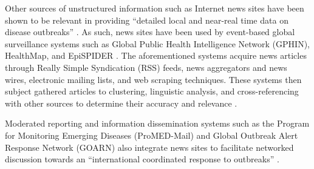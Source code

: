 Other sources of unstructured information such as Internet news sites have been shown to be relevant in providing ``detailed local and near-real time data on disease outbreaks'' \cite{heymann2001hot,madoff2005internet,morse2007global}. As such, news sites have been used by event-based global surveillance systems such as Global Public Health Intelligence Network (GPHIN), HealthMap, and EpiSPIDER \cite{keller2009use}. The aforementioned systems acquire news articles through Really Simple Syndication (RSS) feeds, news aggregators and news wires, electronic mailing lists, and web scraping techniques. These systems then subject gathered articles to clustering, linguistic analysis, and cross-referencing with other sources to determine their accuracy and relevance \cite{keller2009use}. 

Moderated reporting and information dissemination systems such as the Program for Monitoring Emerging Diseases (ProMED-Mail) and Global Outbreak Alert Response Network (GOARN) also integrate news sites to facilitate networked discussion towards an ``international coordinated response to outbreaks'' \cite{choi2016web}.

